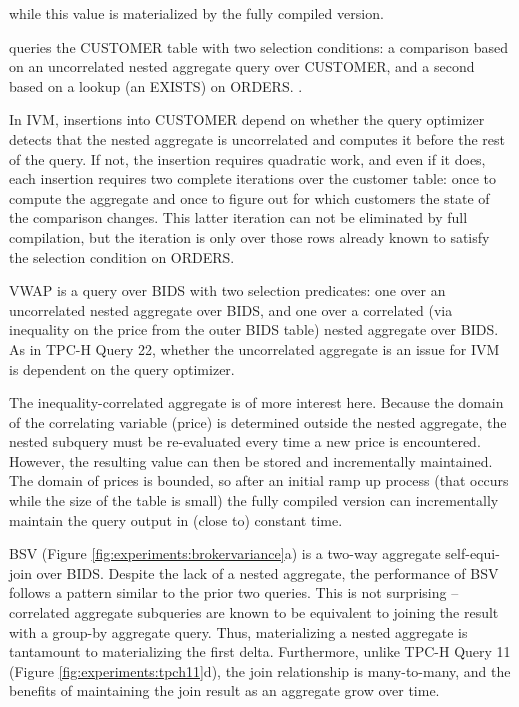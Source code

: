 while this value is materialized by the fully compiled version.


queries the CUSTOMER table with two selection conditions: a comparison based on an uncorrelated nested aggregate query over CUSTOMER, and a second based on a lookup (an EXISTS) on ORDERS.   .  

In IVM, insertions into CUSTOMER depend on whether the query optimizer detects that the nested aggregate is uncorrelated and computes it before the rest of the query.  If not, the insertion requires quadratic work, and even if it does, each insertion requires two complete iterations over the customer table: once to compute the aggregate and once to figure out for which customers the state of the comparison changes.  This latter iteration can not be eliminated by full compilation, but the iteration is only over those rows already known to satisfy the selection condition on ORDERS.

VWAP is a query over BIDS with two selection predicates: one over an uncorrelated nested aggregate over BIDS, and one over a correlated (via inequality on the price from the outer BIDS table) nested aggregate over BIDS.  As in TPC-H Query 22, whether the uncorrelated aggregate is an issue for IVM is dependent on the query optimizer.  

The inequality-correlated aggregate is of more interest here.  Because the domain of the correlating variable (price) is determined outside the nested aggregate, the nested subquery must be re-evaluated every time a new price is encountered.  However, the resulting value can then be stored and incrementally maintained.  The domain of prices is bounded, so after an initial ramp up process (that occurs while the size of the table is small) the fully compiled version can incrementally maintain the query output in (close to) constant time.

BSV (Figure \ref{fig:experiments:brokervariance}a) is a two-way aggregate self-equi-join over BIDS.  Despite the lack of a nested aggregate, the performance of BSV follows a pattern similar to the prior two queries.  This is not surprising -- correlated aggregate subqueries are known to be equivalent to joining the result with a group-by aggregate query.  Thus, materializing a nested aggregate is tantamount to materializing the first delta.  Furthermore, unlike TPC-H Query 11 (Figure \ref{fig:experiments:tpch11}d), the join relationship is many-to-many, and the benefits of maintaining the join result as an aggregate grow over time.

